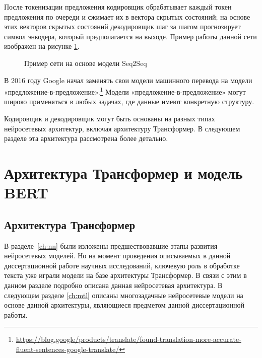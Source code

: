 После токенизации предложения кодировщик обрабатывает каждый токен предложения по очереди  и сжимает их в вектора скрытых состояний; на основе этих векторов скрытых состояний декодировщик шаг за шагом прогнозирует символ энкодера, который предполагается на выходе. Пример работы данной сети изображен на рисунке \ref{fig:Neuro6-Seq2Seq}.

\begin{figure}[ht]
  \caption{Пример сети на основе модели Seq2Seq}\label{fig:Neuro6-Seq2Seq}
\end{figure}

В 2016 году Google начал заменять свои модели машинного перевода на модели «предложение-в-предложение».\footnote{\url{https://blog.google/products/translate/found-translation-more-accurate-fluent-sentences-google-translate/}} Модели «предложение-в-предложение» могут широко применяться в любых задачах, где данные имеют конкретную структуру.
    
Кодировщик и декодировщик могут быть основаны на разных типах нейросетевых архитектур, включая архитектуру Трансформер. В следующем разделе эта архитектура рассмотрена более детально.

\section{Архитектура Трансформер и модель BERT}\label{ch:tr}

\subsection{Архитектура Трансформер}

В разделе~\ref{ch:nn} были изложены предшествовавшие этапы развития нейросетевых моделей. Но на момент проведения описываемых в данной диссертационной работе научных исследований, ключевую роль в обработке текста уже играли модели на базе архитектуры Трансформер. В связи с этим в данном разделе подробно описана данная нейросетевая архитектура. В следующем разделе \ref{ch:mtl} описаны многозадачные нейросетевые модели на основе данной архитектуры, являющиеся предметом данной диссертационной работы. 

